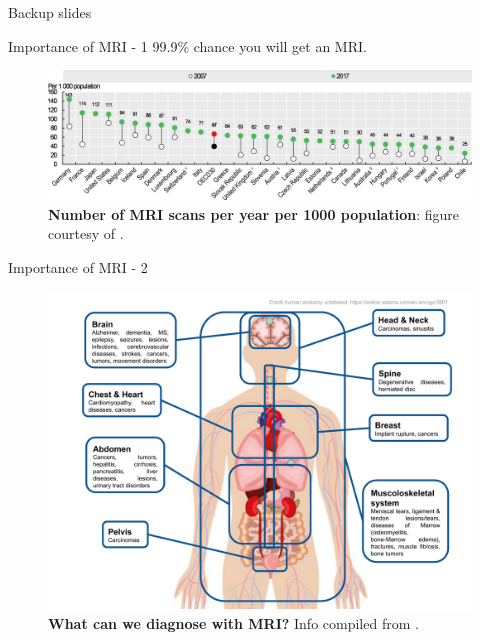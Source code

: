 \appendix

\begin{frame}{}
    Backup slides
\end{frame}

\begin{frame}{Importance of MRI - 1}
    99.9\% chance you will get an MRI.
    \begin{figure}
        \centering
        \includegraphics[width=\textwidth]{Figures/intro_figures/num_mri_scans.png}
        \caption{\label{fig:num-mri-scans} \textbf{Number of MRI scans per year per 1000 population}: figure courtesy of \citet{OECDMRI}.}
    \end{figure}
\end{frame}

\begin{frame}{Importance of MRI - 2}
    \begin{figure}
        \centering
        \includegraphics[height=0.6\textheight]{Figures/intro_figures/What_can_we_diagnose_with_MRI.pdf}
        \caption{\label{fig:diagnose-mri} \textbf{What can we diagnose with MRI?}  Info compiled from \citet{reimer2010clinical,runge2019essentials}.}
    \end{figure}
\end{frame}

